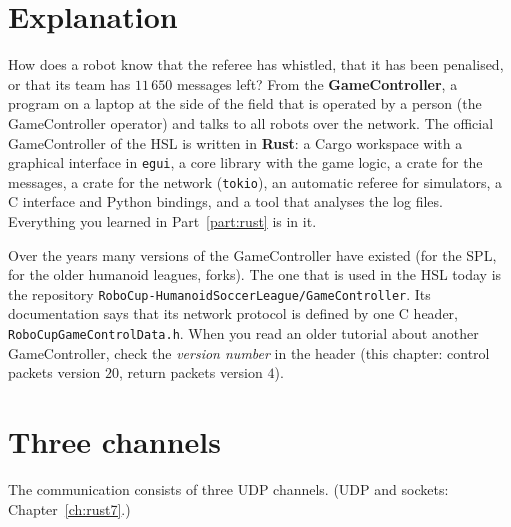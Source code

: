 \label{ch:rc3}

\section*{Explanation}
How does a robot know that the referee has whistled, that it has been penalised, or that its team has $11\,650$ messages left? From the \textbf{GameController}, a program on a laptop at the side of the field that is operated by a person (the GameController operator) and talks to all robots over the network. The official GameController of the HSL is written in \textbf{Rust}: a Cargo workspace with a graphical interface in \texttt{egui}, a core library with the game logic, a crate for the messages, a crate for the network (\texttt{tokio}), an automatic referee for simulators, a C interface and Python bindings, and a tool that analyses the log files. Everything you learned in Part~\ref{part:rust} is in it.

\begin{keyidea}
Over the years many versions of the GameController have existed (for the SPL, for the older humanoid leagues, forks). The one that is used in the HSL today is the repository \texttt{RoboCup-HumanoidSoccerLeague/GameController}. Its documentation says that its network protocol is defined by one C header, \verb!RoboCupGameControlData.h!. When you read an older tutorial about another GameController, check the \emph{version number} in the header (this chapter: control packets version $20$, return packets version $4$).
\end{keyidea}

\section*{Three channels}
The communication consists of three UDP channels. (UDP and sockets: Chapter~\ref{ch:rust7}.)

